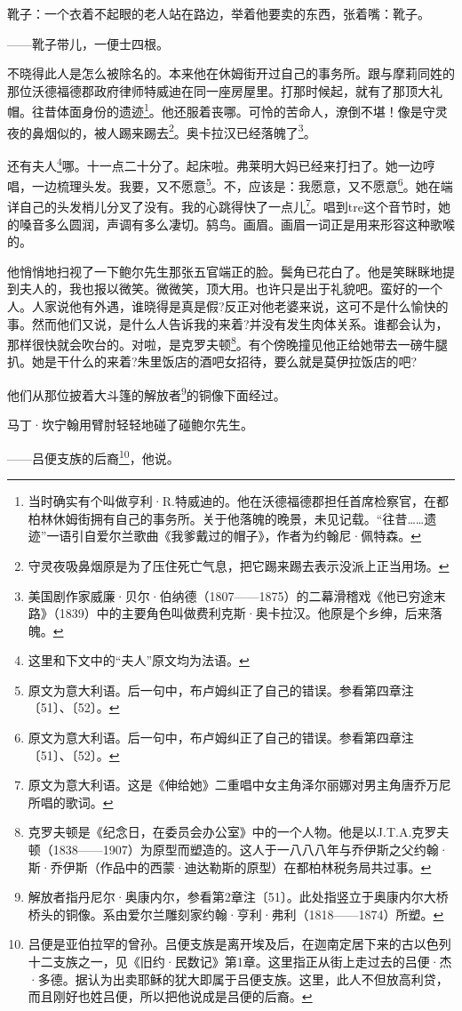 \par 靴子：一个衣着不起眼的老人站在路边，举着他要卖的东西，张着嘴：靴子。
\par ——靴子带儿，一便士四根。
\par 不晓得此人是怎么被除名的。本来他在休姆街开过自己的事务所。跟与摩莉同姓的那位沃德福德郡政府律师特威迪在同一座房屋里。打那时候起，就有了那顶大礼帽。往昔体面身份的遗迹\footnote{当时确实有个叫做亨利·R.特威迪的。他在沃德福德郡担任首席检察官，在都柏林休姆街拥有自己的事务所。关于他落魄的晚景，未见记载。“往昔……遗迹”一语引自爱尔兰歌曲《我爹戴过的帽子》，作者为约翰尼·佩特森。}。他还服着丧哪。可怜的苦命人，潦倒不堪！像是守灵夜的鼻烟似的，被人踢来踢去\footnote{守灵夜吸鼻烟原是为了压住死亡气息，把它踢来踢去表示没派上正当用场。}。奥卡拉汉已经落魄了\footnote{美国剧作家威廉·贝尔·伯纳德（1807——1875）的二幕滑稽戏《他已穷途末路》（1839）中的主要角色叫做费利克斯·奥卡拉汉。他原是个乡绅，后来落魄。}。
\par 还有夫人\footnote{这里和下文中的“夫人”原文均为法语。}哪。十一点二十分了。起床啦。弗莱明大妈已经来打扫了。她一边哼唱，一边梳理头发。我要，又不愿意\footnote{原文为意大利语。后一句中，布卢姆纠正了自己的错误。参看第四章注〔51〕、〔52〕。}。不，应该是：我愿意，又不愿意\footnote{原文为意大利语。后一句中，布卢姆纠正了自己的错误。参看第四章注〔51〕、〔52〕。}。她在端详自己的头发梢儿分叉了没有。我的心跳得快了一点儿\footnote{原文为意大利语。这是《伸给她》二重唱中女主角泽尔丽娜对男主角唐乔万尼所唱的歌词。}。唱到tre这个音节时，她的嗓音多么圆润，声调有多么凄切。鸫鸟。画眉。画眉一词正是用来形容这种歌喉的。
\par 他悄悄地扫视了一下鲍尔先生那张五官端正的脸。鬓角已花白了。他是笑眯眯地提到夫人的，我也报以微笑。微微笑，顶大用。也许只是出于礼貌吧。蛮好的一个人。人家说他有外遇，谁晓得是真是假?反正对他老婆来说，这可不是什么愉快的事。然而他们又说，是什么人告诉我的来着?并没有发生肉体关系。谁都会认为，那样很快就会吹台的。对啦，是克罗夫顿\footnote{克罗夫顿是《纪念日，在委员会办公室》中的一个人物。他是以J.T.A.克罗夫顿（1838——1907）为原型而塑造的。这人于一八八八年与乔伊斯之父约翰·斯·乔伊斯（作品中的西蒙·迪达勒斯的原型）在都柏林税务局共过事。}。有个傍晚撞见他正给她带去一磅牛腿扒。她是干什么的来着?朱里饭店的酒吧女招待，要么就是莫伊拉饭店的吧?
\par 他们从那位披着大斗篷的解放者\footnote{解放者指丹尼尔·奥康内尔，参看第2章注〔51〕。此处指竖立于奥康内尔大桥桥头的铜像。系由爱尔兰雕刻家约翰·亨利·弗利（1818——1874）所塑。}的铜像下面经过。
\par 马丁·坎宁翰用臂肘轻轻地碰了碰鲍尔先生。
\par ——吕便支族的后裔\footnote{吕便是亚伯拉罕的曾孙。吕便支族是离开埃及后，在迦南定居下来的古以色列十二支族之一，见《旧约·民数记》第1章。这里指正从街上走过去的吕便·杰·多德。据认为出卖耶稣的犹大即属于吕便支族。这里，此人不但放高利贷，而且刚好也姓吕便，所以把他说成是吕便的后裔。}，他说。

